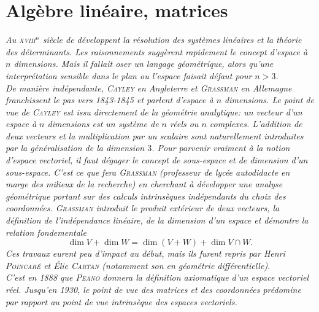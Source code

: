 \chapter{Algèbre linéaire, matrices}

\textsl{Au \textsc{xviii}$^{\mathrm{e}}$ siècle de développent la résolution des systèmes linéaires et la théorie des déterminants. Les raisonnements suggèrent rapidement le concept d'espace à $n$ dimensions. Mais il fallait oser un langage géométrique, alors qu'une interprétation sensible dans le plan ou l'espace faisait défaut pour $n > 3$. \\
De manière indépendante, \textsc{Cayley} en Angleterre et \textsc{Grassman} en Allemagne franchissent le pas vers 1843-1845 et parlent d'espace à $n$ dimensions. Le point de vue de \textsc{Cayley} est issu directement de la géométrie analytique: un vecteur d'un espace à $n$ dimensions est un système de $n$ réels ou $n$ complexes. L'addition de deux vecteurs et la multiplication par un scalaire sont naturellement introduites par la généralisation de la dimension $3$. Pour parvenir vraiment à la notion d'espace vectoriel, il faut dégager le concept de sous-espace et de dimension d'un sous-espace. C'est ce que fera \textsc{Grassman} (professeur de lycée autodidacte en marge des milieux de la recherche) en cherchant à développer une analyse géométrique portant sur des calculs intrinsèques indépendants du choix des coordonnées. \textsc{Grassman} introduit le produit extérieur de deux vecteurs, la définition de l'indépendance linéaire, de la dimension d'un espace et démontre la relation fondementale
$$\dim V + \dim W = \dim (V + W) + \dim V \cap W.$$
Ces travaux eurent peu d'impact au début, mais ils furent repris par Henri \textsc{Poincaré} et Élie \textsc{Cartan} (notamment son  en géométrie différentielle). \\
C'est en 1888 que \textsc{Peano} donnera la définition axiomatique d'un espace vectoriel réel. Jusqu'en 1930, le point de vue des matrices et des coordonnées prédomine par rapport au point de vue intrinsèque des espaces vectoriels.
}

